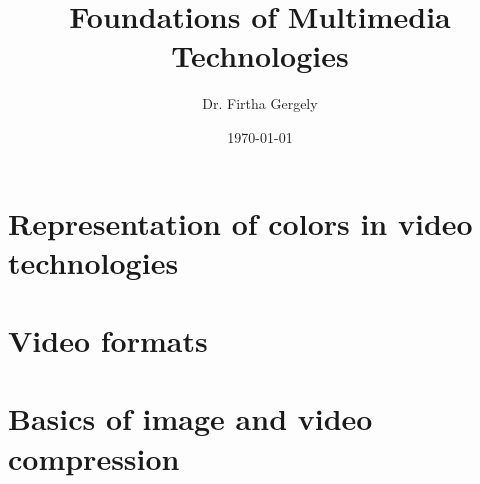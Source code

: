 \documentclass{book}
\title{Foundations of Multimedia Technologies}
\author{Dr. Firtha Gergely}
\date{\today}
\begin{document}
\sloppy 


\titlepage
\maketitle
\cleardoublepage 
  
\tableofcontents

\setcounter{page}{1}			%


\chapter{Representation of colors in video technologies}
\label{sec:video_color_representation}
 

\chapter{Video formats}
\label{sec:video_formats}
 

\chapter{Basics of image and video compression}
\label{sec:compression}
 
\end{document}
